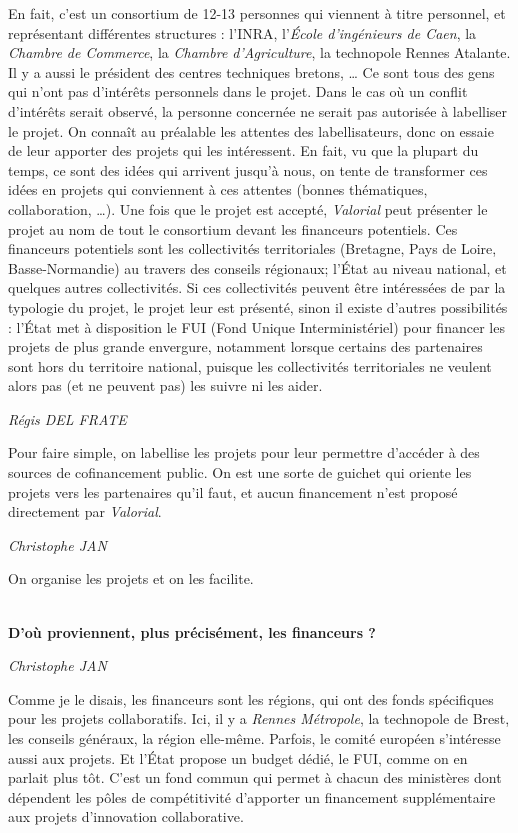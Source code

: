 \documentclass[a4paper,12pt]{report}
\begin{document}
    En fait, c’est un consortium de 12-13 personnes qui viennent à titre personnel, et représentant différentes structures : l’INRA, l’\textit{École d’ingénieurs de Caen}, la \textit{Chambre de Commerce}, la \textit{Chambre d’Agriculture}, la technopole Rennes Atalante. Il y a aussi le président des centres techniques bretons, … Ce sont tous des gens qui n’ont pas d’intérêts personnels dans le projet. Dans le cas où un conflit d’intérêts serait observé, la personne concernée ne serait pas autorisée à labelliser le projet. On connaît au préalable les attentes des labellisateurs, donc on essaie de leur apporter des projets qui les intéressent. En fait, vu que la plupart du temps, ce sont des idées qui arrivent jusqu’à nous, on tente de transformer ces idées en projets qui conviennent à ces attentes (bonnes thématiques, collaboration, …). Une fois que le projet est accepté, \textit{Valorial} peut présenter le projet au nom de tout le consortium devant les financeurs potentiels. Ces financeurs potentiels sont les collectivités territoriales (Bretagne, Pays de Loire, Basse-Normandie) au travers des conseils régionaux; l’État au niveau national, et quelques autres collectivités. Si ces collectivités peuvent être intéressées de par la typologie du projet, le projet leur est présenté, sinon il existe d’autres possibilités : l’État met à disposition le FUI (Fond Unique Interministériel) pour financer les projets de plus grande envergure, notamment lorsque certains des partenaires sont hors du territoire national, puisque les collectivités territoriales ne veulent alors pas (et ne peuvent pas) les suivre ni les aider.

	\emph{Régis DEL FRATE}

    Pour faire simple, on labellise les projets pour leur permettre d’accéder à des sources de cofinancement public. On est une sorte de guichet qui oriente les projets vers les partenaires qu’il faut, et aucun financement n’est proposé directement par \textit{Valorial}.

	\emph{Christophe JAN}

    On organise les projets et on les facilite.

	\textbf{\\D’où proviennent, plus précisément, les financeurs ?}

	\emph{Christophe JAN }

    Comme je le disais, les financeurs sont les régions, qui ont des fonds spécifiques pour les projets collaboratifs. Ici, il y a \textit{Rennes Métropole}, la technopole de Brest, les conseils généraux, la région elle-même. Parfois, le comité européen s’intéresse aussi aux projets. Et l’État propose un budget dédié, le FUI, comme on en parlait plus tôt. C’est un fond commun qui permet à chacun des ministères dont dépendent les pôles de compétitivité d’apporter un financement supplémentaire aux projets d’innovation collaborative.
\end{document}
